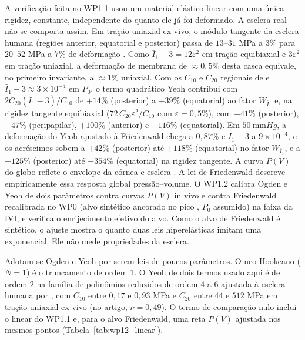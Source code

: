 A verificação feita no WP1.1 usou um material elástico linear com uma única rigidez, constante, independente do quanto ele já foi deformado. A esclera real não se comporta assim. Em tração uniaxial ex vivo, o módulo tangente da esclera humana (regiões anterior, equatorial e posterior) passa de $13$--$31$ MPa a $3\%$ para $20$--$52$ MPa a $7\%$ de deformação \citep{park2021sclera}. Como $\bar I_1-3=12\varepsilon^2$ em tração equibiaxial e $3\varepsilon^2$ em tração uniaxial, a deformação de membrana de $\approx0{,}5\%$ desta casca equivale, no primeiro invariante, a $\approx1\%$ uniaxial. Com os $C_{10}$ e $C_{20}$ regionais de \citet{park2021sclera} e $\bar I_1-3\approx3\times10^{-4}$ em $P_0$, o termo quadrático Yeoh contribui com $2C_{20}(\bar I_1-3)/C_{10}$ de $+14\%$ (posterior) a $+39\%$ (equatorial) ao fator $W_{\bar I_1}$ e, na rigidez tangente equibiaxial ($72\,C_{20}\varepsilon^2/C_{10}$ com $\varepsilon=0{,}5\%$), com $+41\%$ (posterior), $+47\%$ (peripapilar), $+100\%$ (anterior) e $+116\%$ (equatorial). Em $\SI{50}{\milli\meter Hg}$, a deformação do Yeoh ajustado à Friedenwald chega a $0{,}87\%$ e $\bar I_1-3$ a $9\times10^{-4}$, e os acréscimos sobem a $+42\%$ (posterior) até $+118\%$ (equatorial) no fator $W_{\bar I_1}$, e a $+125\%$ (posterior) até $+354\%$ (equatorial) na rigidez tangente. A curva $P(V)$ do globo reflete o envelope da córnea e esclera \citep{ethier2004biomech}. A lei de Friedenwald \citep{friedenwald1937} descreve empiricamente essa resposta global pressão--volume. O WP1.2 calibra Ogden e Yeoh de dois parâmetros contra curvas $P(V)$ in vivo \citep{pallikaris2005, silvergeyer2000} e contra Friedenwald recalibrada no WP0 (alvo sintético ancorado no pico \citep{knecht2009}, $P_0$ assumido) na faixa da IVI, e verifica o enrijecimento efetivo do alvo. Como o alvo de Friedenwald é sintético, o ajuste mostra o quanto duas leis hiperelásticas imitam uma exponencial. Ele não mede propriedades da esclera.
 
Adotam-se Ogden \citep{ogden1972large} e Yeoh \citep{yeoh1993some} por serem leis de poucos parâmetros. O neo-Hookeano ($N=1$) é o truncamento de ordem $1$. O Yeoh de dois termos usado aqui é de ordem $2$ na família de polinômios reduzidos de ordem $4$ a $6$ ajustada à esclera humana por \citet{park2021sclera}, com $C_{10}$ entre $0{,}17$ e $0{,}93$ MPa e $C_{20}$ entre $44$ e $512$ MPa em tração uniaxial ex vivo (no artigo, $\nu=0{,}49$). O termo de comparação nulo inclui o linear do WP1.1 e, para o alvo Friedenwald, uma reta $P(V)$ ajustada nos mesmos pontos (Tabela~\ref{tab:wp12_linear}).
 
